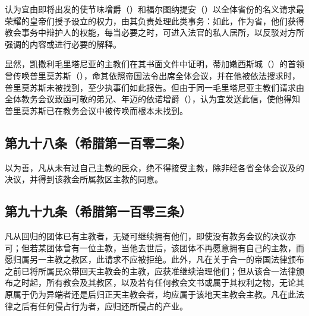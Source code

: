 \par

认为宜由即将出发的使节味增爵（）和福尔图纳提安（）以全体省份的名义请求最荣耀的皇帝们授予设立的权力，由其负责处理此类事务：如此，作为省，他们获得教会事务中辩护人的权能，每当必要之时，可进入法官的私人居所，以反驳对方所强调的内容或进行必要的解释。\par

\par

显然，凯撒利毛里塔尼亚的主教们在其书面文件中证明，蒂加嫩西斯城（）的首领曾传唤普里莫苏斯（），命其依照帝国法令出席全体会议，并在他被依法搜求时，普里莫苏斯未被找到，至少执事们如此报告。但由于同一毛里塔尼亚主教们请求由全体教务会议致函可敬的弟兄、年迈的依诺增爵（），认为宜发送此信，使他得知普里莫苏斯已在教务会议中被传唤而根本未找到。\par


\subsection{第九十八条（希腊第一百零二条）}

\par

以为善，凡从未有过自己主教的民众，绝不得接受主教，除非经各省全体会议及的决议，并得到该教会所属教区主教的同意。\par


\subsection{第九十九条（希腊第一百零三条）}

\par

凡从回归的团体已有主教者，无疑可继续拥有他们，即使没有教务会议的决议亦可；但若某团体曾有一位主教，当他去世后，该团体不再愿意拥有自己的主教，而愿归属另一主教之教区，此请求不应被拒绝。此外，凡在关于合一的帝国法律颁布之前已将所属民众带回天主教会的主教，应获准继续治理他们；但从该合一法律颁布之时起，所有教会及其教区，以及若有任何教会文书或属于其权利之物，无论其原属于仍为异端者还是后归正天主教会者，均应属于该地天主教会主教。凡在此法律之后有任何侵占行为者，应归还所侵占的产业。\par

